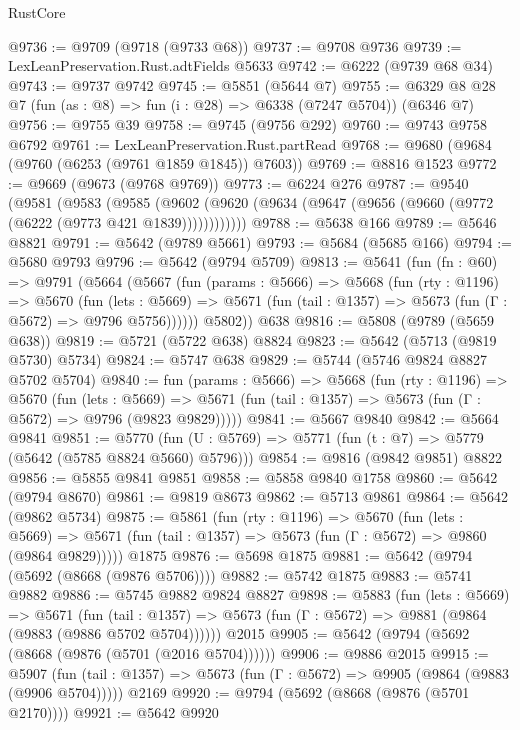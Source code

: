 \begin{lexlean}{RustCore}
\begin{coremodule}
@9736 := @9709 (@9718 (@9733 @68))
@9737 := @9708 @9736
@9739 := LexLeanPreservation.Rust.adtFields @5633
@9742 := @6222 (@9739 @68 @34)
@9743 := @9737 @9742
@9745 := @5851 (@5644 @7)
@9755 := @6329 @8 @28 @7 (fun (as : @8) => fun (i : @28) => @6338 (@7247 @5704)) (@6346 @7)
@9756 := @9755 @39
@9758 := @9745 (@9756 @292)
@9760 := @9743 @9758 @6792
@9761 := LexLeanPreservation.Rust.partRead
@9768 := @9680 (@9684 (@9760 (@6253 (@9761 @1859 @1845)) @7603))
@9769 := @8816 @1523
@9772 := @9669 (@9673 (@9768 @9769))
@9773 := @6224 @276
@9787 := @9540
    (@9581
      (@9583
        (@9585 (@9602 (@9620 (@9634 (@9647 (@9656 (@9660 (@9772 (@6222 (@9773 @421 @1839))))))))))))
@9788 := @5638 @166
@9789 := @5646 @8821
@9791 := @5642 (@9789 @5661)
@9793 := @5684 (@5685 @166)
@9794 := @5680 @9793
@9796 := @5642 (@9794 @5709)
@9813 := @5641
    (fun (fn : @60) =>
    @9791
      (@5664
        (@5667
          (fun (params : @5666) =>
          @5668
            (fun (rty : @1196) =>
            @5670
              (fun (lets : @5669) =>
              @5671 (fun (tail : @1357) => @5673 (fun (Γ : @5672) => @9796 @5756))))))
        @5802))
    @638
@9816 := @5808 (@9789 (@5659 @638))
@9819 := @5721 (@5722 @638) @8824
@9823 := @5642 (@5713 (@9819 @5730) @5734)
@9824 := @5747 @638
@9829 := @5744 (@5746 @9824 @8827 @5702 @5704)
@9840 := fun (params : @5666) =>
  @5668
    (fun (rty : @1196) =>
    @5670
      (fun (lets : @5669) =>
      @5671 (fun (tail : @1357) => @5673 (fun (Γ : @5672) => @9796 (@9823 @9829)))))
@9841 := @5667 @9840
@9842 := @5664 @9841
@9851 := @5770 (fun (U : @5769) => @5771 (fun (t : @7) => @5779 (@5642 (@5785 @8824 @5660) @5796)))
@9854 := @9816 (@9842 @9851) @8822
@9856 := @5855 @9841 @9851
@9858 := @5858 @9840 @1758
@9860 := @5642 (@9794 @8670)
@9861 := @9819 @8673
@9862 := @5713 @9861
@9864 := @5642 (@9862 @5734)
@9875 := @5861
    (fun (rty : @1196) =>
    @5670
      (fun (lets : @5669) =>
      @5671 (fun (tail : @1357) => @5673 (fun (Γ : @5672) => @9860 (@9864 @9829)))))
    @1875
@9876 := @5698 @1875
@9881 := @5642 (@9794 (@5692 (@8668 (@9876 @5706))))
@9882 := @5742 @1875
@9883 := @5741 @9882
@9886 := @5745 @9882 @9824 @8827
@9898 := @5883
    (fun (lets : @5669) =>
    @5671
      (fun (tail : @1357) => @5673 (fun (Γ : @5672) => @9881 (@9864 (@9883 (@9886 @5702 @5704))))))
    @2015
@9905 := @5642 (@9794 (@5692 (@8668 (@9876 (@5701 (@2016 @5704))))))
@9906 := @9886 @2015
@9915 := @5907
    (fun (tail : @1357) => @5673 (fun (Γ : @5672) => @9905 (@9864 (@9883 (@9906 @5704)))))
    @2169
@9920 := @9794 (@5692 (@8668 (@9876 (@5701 @2170))))
@9921 := @5642 @9920

\end{coremodule}
\end{lexlean}

